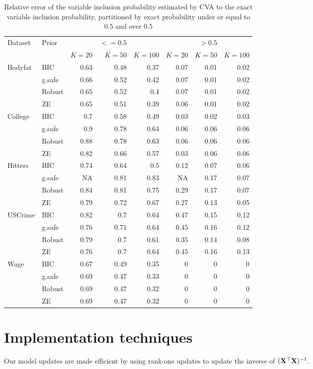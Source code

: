 \begin{table}\label{tab:variable_inclusion_rel_error}
\caption{Relative error of the variable inclusion probability estimated by CVA to the
					exact variable inclusion probability, partitioned by exact probability under or equal to $0.5$ and
					over $0.5$}
\begin{tabular}{|ll|rrr|rrr|}
	\hline
	Dataset & Prior & & $<=0.5$ & & & $>0.5$ &\\
	& & $K = 20$ & $K = 50$ & $K = 100$ & $K = 20$ & $K = 50$ & $K = 100$ \\
	\hline
	Bodyfat&BIC&0.63&0.48&0.37&0.07&0.01&0.02\\
	&g.safe&0.66&0.52&0.42&0.07&0.01&0.02\\
	&Robust&0.65&0.52&0.4&0.07&0.01&0.02\\
	&ZE&0.65&0.51&0.39&0.06&0.01&0.02\\
	College&BIC&0.7&0.58&0.49&0.03&0.02&0.03\\
	&g.safe&0.9&0.78&0.64&0.06&0.06&0.06\\
	&Robust&0.88&0.78&0.63&0.06&0.06&0.06\\
	&ZE&0.82&0.66&0.57&0.03&0.06&0.06\\
	Hitters&BIC&0.74&0.64&0.5&0.12&0.07&0.06\\
	&g.safe&NA&0.81&0.83&NA&0.17&0.07\\
	&Robust&0.84&0.81&0.75&0.29&0.17&0.07\\
	&ZE&0.79&0.72&0.67&0.27&0.13&0.05\\
	USCrime&BIC&0.82&0.7&0.64&0.47&0.15&0.12\\
	&g.safe&0.76&0.71&0.64&0.45&0.16&0.12\\
	&Robust&0.79&0.7&0.61&0.35&0.14&0.08\\
	&ZE&0.76&0.7&0.64&0.45&0.16&0.13\\
	Wage&BIC&0.67&0.49&0.35&0&0&0\\
	&g.safe&0.69&0.47&0.33&0&0&0\\
	&Robust&0.69&0.47&0.32&0&0&0\\
	&ZE&0.69&0.47&0.32&0&0&0\\
	\hline
\end{tabular}
\end{table}

\section{Implementation techniques}
Our model updates are made efficient by using rank-one updates to update the inverse of $({\bf X}^\top {\bf X})^{-1}$.

